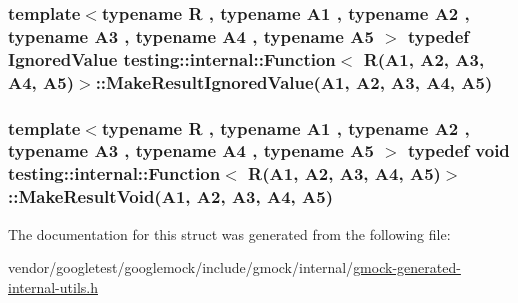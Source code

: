 \subsubsection[{\texorpdfstring{Make\+Result\+Ignored\+Value}{MakeResultIgnoredValue}}]{\setlength{\rightskip}{0pt plus 5cm}template$<$typename R , typename A1 , typename A2 , typename A3 , typename A4 , typename A5 $>$ typedef {\bf Ignored\+Value} {\bf testing\+::internal\+::\+Function}$<$ R(A1, A2, A3, A4, A5)$>$\+::Make\+Result\+Ignored\+Value(A1, A2, A3, A4, A5)}\hypertarget{structtesting_1_1internal_1_1Function_3_01R_07A1_00_01A2_00_01A3_00_01A4_00_01A5_08_4_a552ce4ec27e2d09fa1c133c66f72d7b3}{}\label{structtesting_1_1internal_1_1Function_3_01R_07A1_00_01A2_00_01A3_00_01A4_00_01A5_08_4_a552ce4ec27e2d09fa1c133c66f72d7b3}
\subsubsection[{\texorpdfstring{Make\+Result\+Void}{MakeResultVoid}}]{\setlength{\rightskip}{0pt plus 5cm}template$<$typename R , typename A1 , typename A2 , typename A3 , typename A4 , typename A5 $>$ typedef void {\bf testing\+::internal\+::\+Function}$<$ R(A1, A2, A3, A4, A5)$>$\+::Make\+Result\+Void(A1, A2, A3, A4, A5)}\hypertarget{structtesting_1_1internal_1_1Function_3_01R_07A1_00_01A2_00_01A3_00_01A4_00_01A5_08_4_a2903acde18de33d756eef4d43d843c04}{}\label{structtesting_1_1internal_1_1Function_3_01R_07A1_00_01A2_00_01A3_00_01A4_00_01A5_08_4_a2903acde18de33d756eef4d43d843c04}


The documentation for this struct was generated from the following file\+:\begin{DoxyCompactItemize}
\item 
vendor/googletest/googlemock/include/gmock/internal/\hyperlink{gmock-generated-internal-utils_8h}{gmock-\/generated-\/internal-\/utils.\+h}\end{DoxyCompactItemize}
